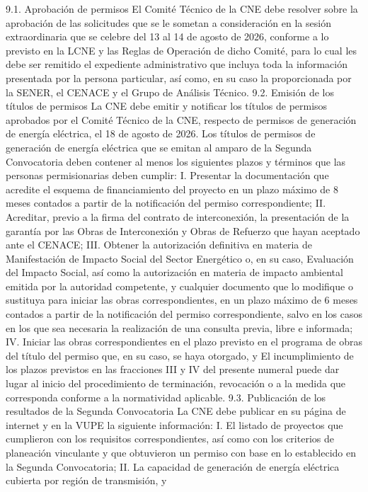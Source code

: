 9.1. Aprobación de permisos
El Comité Técnico de la CNE debe resolver sobre la aprobación de las solicitudes que se le sometan a consideración en la sesión extraordinaria que se celebre del 13 al 14 de agosto de 2026, conforme a lo previsto en la LCNE y las Reglas de Operación de dicho Comité, para lo cual les debe ser remitido el expediente administrativo que incluya toda la información presentada por la persona particular, así como, en su caso la proporcionada por la SENER, el CENACE y el Grupo de Análisis Técnico.
9.2. Emisión de los títulos de permisos
La CNE debe emitir y notificar los títulos de permisos aprobados por el Comité Técnico de la CNE, respecto de permisos de generación de energía eléctrica, el 18 de agosto de 2026.
Los títulos de permisos de generación de energía eléctrica que se emitan al amparo de la Segunda Convocatoria deben contener al menos los siguientes plazos y términos que las personas permisionarias deben cumplir:
I. Presentar la documentación que acredite el esquema de financiamiento del proyecto en un plazo máximo de 8 meses contados a partir de la notificación del permiso correspondiente;
II. Acreditar, previo a la firma del contrato de interconexión, la presentación de la garantía por las Obras de Interconexión y Obras de Refuerzo que hayan aceptado ante el CENACE;
III. Obtener la autorización definitiva en materia de Manifestación de Impacto Social del Sector Energético o, en su caso, Evaluación del Impacto Social, así como la autorización en materia de impacto ambiental emitida por la autoridad competente, y cualquier documento que lo modifique o sustituya para iniciar las obras correspondientes, en un plazo máximo de 6 meses contados a partir de la notificación del permiso correspondiente, salvo en los casos en los que sea necesaria la realización de una consulta previa, libre e informada;
IV. Iniciar las obras correspondientes en el plazo previsto en el programa de obras del título del permiso que, en su caso, se haya otorgado, y
El incumplimiento de los plazos previstos en las fracciones III y IV del presente numeral puede dar lugar al inicio del procedimiento de terminación, revocación o a la medida que corresponda conforme a la normatividad aplicable.
9.3. Publicación de los resultados de la Segunda Convocatoria
La CNE debe publicar en su página de internet y en la VUPE la siguiente información:
I. El listado de proyectos que cumplieron con los requisitos correspondientes, así como con los criterios de planeación vinculante y que obtuvieron un permiso con base en lo establecido en la Segunda Convocatoria;
II. La capacidad de generación de energía eléctrica cubierta por región de transmisión, y
